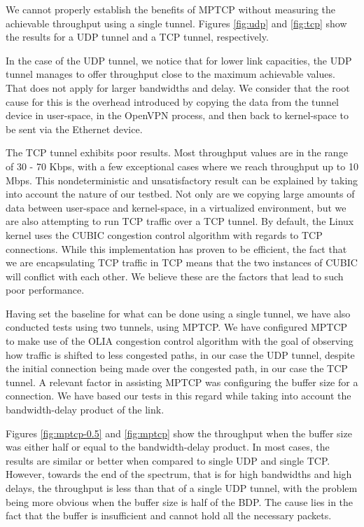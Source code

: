 
We cannot properly establish the benefits of MPTCP without measuring the
achievable throughput using a single tunnel. Figures \ref{fig:udp} and
\ref{fig:tcp} show the results for a UDP tunnel and a TCP tunnel,
respectively.

In the case of the UDP tunnel, we notice that for lower link capacities, the
UDP tunnel manages to offer throughput close to the maximum achievable values.
That does not apply for larger bandwidths and delay. We consider that the root
cause for this is the overhead introduced by copying the data from the tunnel
device in user-space, in the OpenVPN process, and then back to kernel-space to
be sent via the Ethernet device.

The TCP tunnel exhibits poor results. Most throughput values are in the range
of 30 - 70 Kbps, with a few exceptional cases where we reach throughput up to
10 Mbps. This nondeterministic and unsatisfactory result can be explained by
taking into account the nature of our testbed. Not only are we copying large
amounts of data between user-space and kernel-space, in a virtualized
environment, but we are also attempting to run TCP traffic over a TCP tunnel.
By default, the Linux kernel uses the CUBIC congestion control algorithm with
regards to TCP connections. While this implementation has proven to be
efficient, the fact that we are encapsulating TCP traffic in TCP means that
the two instances of CUBIC will conflict with each other. We believe these are the
factors that lead to such poor performance.

Having set the baseline for what can be done using a single tunnel, we have
also conducted tests using two tunnels, using MPTCP. We have configured MPTCP
to make use of the OLIA congestion control algorithm with the goal of
observing how traffic is shifted to less congested paths, in our case the UDP
tunnel, despite the initial connection being made over the congested path, in
our case the TCP tunnel. A relevant factor in assisting MPTCP was configuring
the buffer size for a connection. We have based our tests in this regard while
taking into account the bandwidth-delay product of the link.

Figures \ref{fig:mptcp-0.5} and \ref{fig:mptcp} show the throughput when the
buffer size was either half or equal to the bandwidth-delay product. In most
cases, the results are similar or better when compared to single UDP and
single TCP. However, towards the end of the spectrum, that is for high
bandwidths and high delays, the throughput is less than that of a single UDP
tunnel, with the problem being more obvious when the buffer size is half of
the BDP. The cause lies in the fact that the buffer is insufficient and cannot
hold all the necessary packets.


